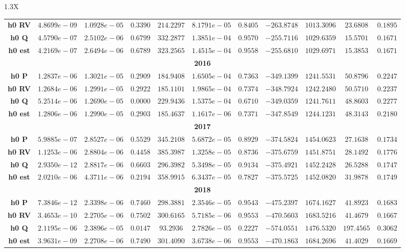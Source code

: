 \documentclass[10pt]{article}
\begin{document}
{\begin{tabularx}{1.3\textwidth}{X}
{\begin{tabular}{ccccccccccc}
 { {\bf h0 RV}}& $4.8699e-09$ & $1.0928e-05$ & $0.3390$ & $214.2297$ & $8.1791e-05$ & $0.8405$ & $-263.8748$& $1013.3096$& $23.6808$ &$0.1895$\\
 { {\bf h0 Q}}& $4.5790e-07$ & $2.5102e-06$ & $0.6799$ & $332.2877$ & $1.3851e-04$ & $0.9570$ & $-255.7116$& $1029.6359$& $15.5701$ &$0.1671$\\
 { {\bf h0 est}}& $4.2169e-07$ & $2.6494e-06$ & $0.6789$ & $323.2565$ & $1.4515e-04$ & $0.9558$ & $-255.6810$& $1029.6971$& $15.3853$ &$0.1671$\\
\bottomrule
\multicolumn{11}{c}{{\bf2016}} \\
\cmidrule(r){1-11} 
 { {\bf h0 P}}& $1.2837e-06$ & $1.3021e-05$ & $0.2909$ & $184.9408$ & $1.6505e-04$ & $0.7363$ & $-349.1399$& $1241.5531$& $50.8796$ &$0.2247$\\
 { {\bf h0 RV}}& $1.2684e-06$ & $1.2991e-05$ & $0.2922$ & $185.1101$ & $1.9865e-04$ & $0.7374$ & $-348.7924$& $1242.2480$& $50.5710$ &$0.2237$\\
 { {\bf h0 Q}}& $5.2514e-06$ & $1.2690e-05$ & $0.0000$ & $229.9436$ & $1.5375e-04$ & $0.6710$ & $-349.0359$& $1241.7611$& $48.8603$ &$0.2277$\\
 { {\bf h0 est}}& $1.2806e-06$ & $1.2990e-05$ & $0.2903$ & $185.4637$ & $1.1617e-06$ & $0.7371$ & $-347.8549$& $1244.1231$& $48.3143$ &$0.2180$\\
\bottomrule
\multicolumn{11}{c}{{\bf2017}} \\
\cmidrule(r){1-11} 
 { {\bf h0 P}}& $5.9885e-07$ & $2.8527e-06$ & $0.5529$ & $345.2108$ & $5.6872e-05$ & $0.8929$ & $-374.5824$& $1454.0623$& $27.1638$ &$0.1734$\\
 { {\bf h0 RV}}& $1.1253e-06$ & $2.8804e-06$ & $0.4458$ & $385.3987$ & $1.3258e-05$ & $0.8736$ & $-375.6759$& $1451.8751$& $28.1492$ &$0.1776$\\
 { {\bf h0 Q}}& $2.9350e-12$ & $2.8817e-06$ & $0.6603$ & $296.3982$ & $5.3498e-05$ & $0.9134$ & $-375.4921$& $1452.2428$& $26.5288$ &$0.1747$\\
 { {\bf h0 est}}& $2.0210e-06$ & $4.3711e-06$ & $0.2194$ & $358.9915$ & $6.3437e-05$ & $0.7827$ & $-375.5725$& $1452.0820$& $31.9878$ &$0.1749$\\
\bottomrule
\multicolumn{11}{c}{{\bf2018}} \\
\cmidrule(r){1-11} 
 { {\bf h0 P}}& $7.3846e-12$ & $2.3398e-06$ & $0.7460$ & $298.3881$ & $2.3546e-05$ & $0.9543$ & $-475.2397$& $1674.1627$& $41.8923$ &$0.1683$\\
 { {\bf h0 RV}}& $3.4653e-10$ & $2.2705e-06$ & $0.7502$ & $300.6165$ & $5.7185e-06$ & $0.9553$ & $-470.5603$& $1683.5216$& $41.4679$ &$0.1667$\\
 { {\bf h0 Q}}& $2.1195e-06$ & $2.3896e-05$ & $0.0147$ & $93.2936$ & $2.7826e-05$ & $0.2227$ & $-574.0551$& $1476.5320$& $197.4565$ &$0.3062$\\
 { {\bf h0 est}}& $3.9631e-09$ & $2.2708e-06$ & $0.7490$ & $301.4090$ & $3.6738e-06$ & $0.9553$ & $-470.1863$& $1684.2696$& $41.4029$ &$0.1669$\\
\bottomrule
\end{tabular}}
\end{tabularx}}

  \vspace{3 cm}

  
\end{document}

